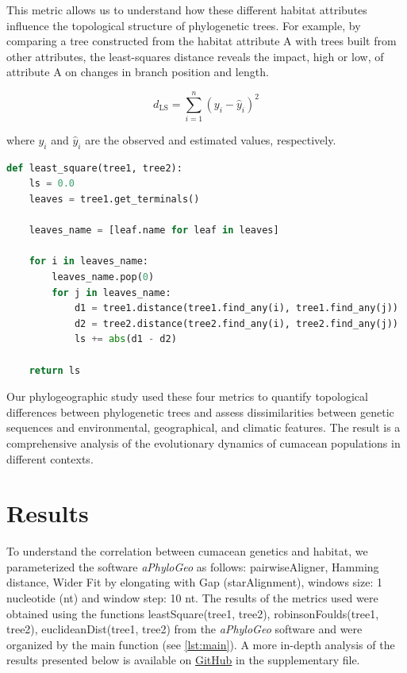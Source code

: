 This metric allows us to understand how these different habitat attributes influence the topological structure of phylogenetic trees. For example, by comparing a tree constructed from the habitat attribute A with trees built from other attributes, the least-squares distance reveals the impact, high or low, of attribute A on changes in branch position and length.

\begin{equation}\label{eq:ls}
    d_{\text{LS}} = \sum_{i=1}^{n} (y_i - \hat{y}_i)^2
\end{equation}

where $y_i$ and $\hat{y}_i$ are the observed and estimated values, respectively.

\begin{lstlisting}[label=lst:LeastSquare, language=Python, caption=Python script for calculating the Least-Square distance using the ete3 package in the aPhyloGeo package]
def least_square(tree1, tree2):
    ls = 0.0
    leaves = tree1.get_terminals()

    leaves_name = [leaf.name for leaf in leaves]
    
    for i in leaves_name:
        leaves_name.pop(0)
        for j in leaves_name:
            d1 = tree1.distance(tree1.find_any(i), tree1.find_any(j))
            d2 = tree2.distance(tree2.find_any(i), tree2.find_any(j))
            ls += abs(d1 - d2)
    
    return ls
\end{lstlisting}

Our phylogeographic study used these four metrics to quantify topological differences between phylogenetic trees and assess dissimilarities between genetic sequences and environmental, geographical, and climatic features. The result is a comprehensive analysis of the evolutionary dynamics of cumacean populations in different contexts.

\section{Results}\label{results}
To understand the correlation between cumacean genetics and habitat, we parameterized the software \textit{aPhyloGeo} as follows: pairwiseAligner, Hamming distance, Wider Fit by elongating with Gap (starAlignment), windows size: 1 nucleotide (nt) and window step: 10 nt. The results of the metrics used were obtained using the functions leastSquare(tree1, tree2), robinsonFoulds(tree1, tree2), euclideanDist(tree1, tree2) from the \textit{aPhyloGeo} software and were organized by the main function (see \autoref{lst:main}). A more in-depth analysis of the results presented below is available on \href{https://github.com/tahiri-lab/Cumacea_aPhyloGeo}{GitHub} in the supplementary file.

